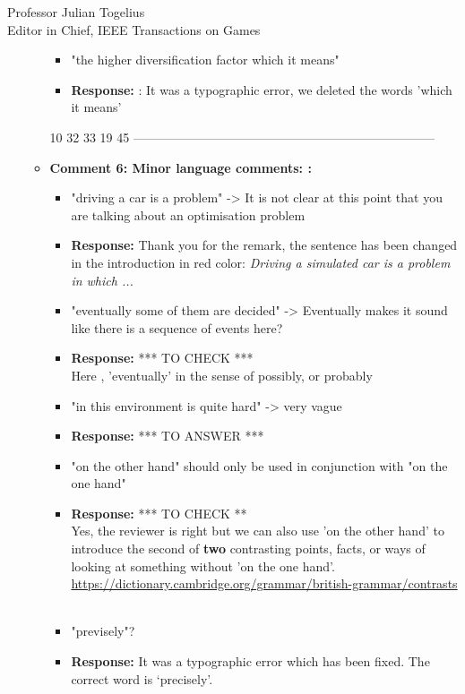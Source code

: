 \documentclass[10pt]{letter} %
\begin{document}
\begin{letter}{Professor Julian Togelius \\ Editor in Chief, IEEE Transactions on Games}
\begin{enumerate}
\begin{itemize}
\begin{itemize}
			\item "the higher diversification factor which it means"
					\item {\bf Response:} : It was a typographic error, we deleted the words 'which it means' 
			\end{itemize}
	
10
32 33 19 
 45 ------------------------------------------------------------------------

	\item {\bf   Comment 6: Minor language comments: :} 
				\begin{itemize}
				\item 	"driving a car is a problem" -> It is not clear at this point that you are talking about an optimisation problem
				\item {\bf Response:}  
				Thank you for the remark, the sentence has been changed in the introduction in red color:
				{\em Driving a simulated car is a problem in which ... }
				\\
				\item 	"eventually some of them are decided" -> Eventually makes it sound like there is a sequence of events here?
				\item {\bf Response:} *** TO CHECK ***\\
				Here , 'eventually' in the sense of possibly, or probably

				\item 	"in this environment is quite hard" -> very vague
				\item {\bf Response:} *** TO ANSWER ***\\

				\item 	"on the other hand" should only be used in conjunction with "on the one hand"
				\item {\bf Response:} *** TO CHECK **\\
			Yes, the reviewer is right but we can also use 'on the other hand' to introduce the second of {\bf two } contrasting points, facts, or ways of looking at something without 'on the one hand'.\\
			\url{https://dictionary.cambridge.org/grammar/british-grammar/contrasts}	\\
				\\
				\item 	"previsely"?
				\item {\bf Response:} It was a typographic error which has been fixed. The correct word is `precisely'.
			

\end{itemize}
\end{itemize}
\end{enumerate}
\end{letter}
\end{document}
